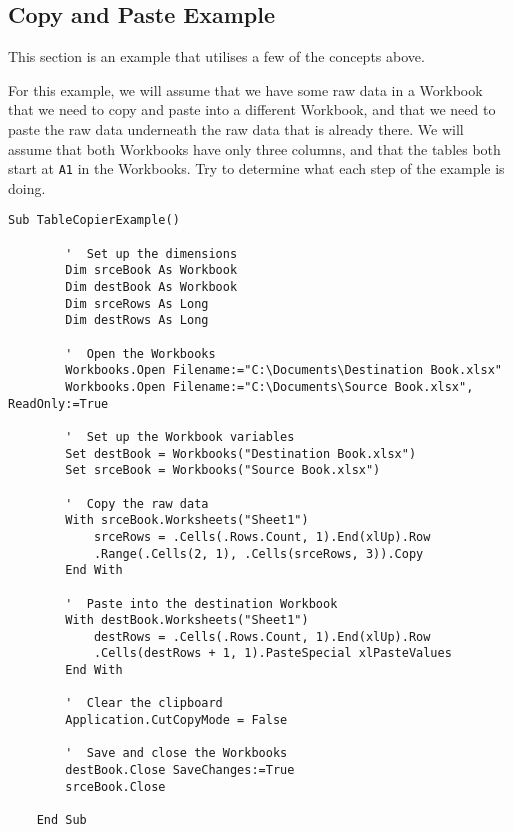\documentclass[11pt]{article}%
\begin{document}
\subsection{Copy and Paste Example}\label{subsec:CopyAndPasteExample}

This section is an example that utilises a few of the concepts above.

For this example, we will assume that we have some raw data in a Workbook that we need to copy and paste into a different Workbook, and that we need to paste the raw data underneath the raw data that is already there. We will assume that both Workbooks have only three columns, and that the tables both start at \texttt{A1} in the Workbooks. Try to determine what each step of the example is doing.\\

\begin{lstlisting}[style=A]
    Sub TableCopierExample()

        '  Set up the dimensions
        Dim srceBook As Workbook
        Dim destBook As Workbook
        Dim srceRows As Long
        Dim destRows As Long

        '  Open the Workbooks
        Workbooks.Open Filename:="C:\Documents\Destination Book.xlsx"
        Workbooks.Open Filename:="C:\Documents\Source Book.xlsx", ReadOnly:=True

        '  Set up the Workbook variables
        Set destBook = Workbooks("Destination Book.xlsx")
        Set srceBook = Workbooks("Source Book.xlsx")

        '  Copy the raw data
        With srceBook.Worksheets("Sheet1")
            srceRows = .Cells(.Rows.Count, 1).End(xlUp).Row
            .Range(.Cells(2, 1), .Cells(srceRows, 3)).Copy
        End With

        '  Paste into the destination Workbook
        With destBook.Worksheets("Sheet1")
            destRows = .Cells(.Rows.Count, 1).End(xlUp).Row
            .Cells(destRows + 1, 1).PasteSpecial xlPasteValues
        End With

        '  Clear the clipboard
        Application.CutCopyMode = False

        '  Save and close the Workbooks
        destBook.Close SaveChanges:=True
        srceBook.Close

    End Sub
\end{lstlisting}

\end{document}
